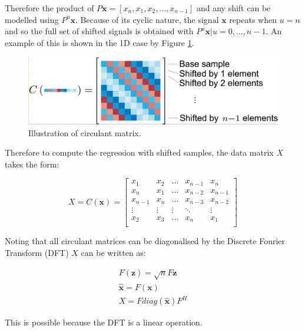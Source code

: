 \documentclass[11pt,twoside]{report}
\begin{document}
Therefore the product of $P\mathbf{x} = [x_{n},x_{1},x_{2},...,x_{n-1}]$ and any shift can be modelled using $P^{u}\mathbf{x}$. Because of its cyclic nature, the signal $\mathbf{x}$ repeats when $u=n$ and so the full set of shifted signals is obtained with ${P^{u}\mathbf{x} | u=0,...,n-1}$. An example of this is shown in the 1D case by Figure \ref{circular_data}.

\noindent \begin{figure}[h!]
	\includegraphics[width = 1.0\hsize]{figures/circular_shift.png}
	\caption{Illustration of circulant matrix.\cite{kcf}}
	\label{circular_data}
\end{figure}

Therefore to compute the regression with shifted samples, the data matrix $X$ takes the form:

\begin{equation}
X = C(\mathbf{x}) = 
\begin{bmatrix}
x_{1} & x_{2} & \dots & x_{n-1} & x_{n} \\
x_{n} & x_{1} & \dots & x_{n-2}  & x_{n-1}  \\
x_{n-1} & x_{n} & \dots & x_{n-3} & x_{n-2}  \\
\vdots & \vdots & \vdots & \ddots & \vdots \\
x_{2}  & x_{3}  & \dots & x_{n} & x_{1} \\
\end{bmatrix}
\end{equation}

Noting that all circulant matrices can be diagonalised by the Discrete Fourier Transform (DFT) $X$ can be written as:


\begin{equation}
\begin{aligned}
\mathit{F}(\mathbf{z}) = \sqrt{n}F\mathbf{z} \\
\hat{\mathbf{x}} = \mathit{F}(\mathbf{x}) \\
X = F diag(\hat{\mathbf{x}}) F^{H}
\end{aligned}
\end{equation}

This is possible because the DFT is a linear operation. 
\end{document}
